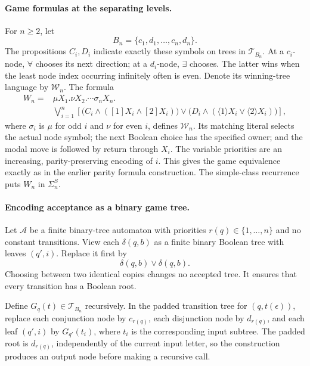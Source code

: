 \paragraph{Game formulas at the separating levels.}
For \(n\geq2\), let
\[
 B_n=\{c_1,d_1,\ldots,c_n,d_n\}.
\]
The propositions \(C_i,D_i\)
indicate exactly these
symbols on trees in
\(\mathcal T_{B_n}\).
At a \(c_i\)-node,
\(\forall\) chooses its
next direction; at a
\(d_i\)-node, \(\exists\)
chooses. The latter wins
when the least node
index occurring infinitely
often is even.
Denote its winning-tree
language by \(\mathcal W_n\).
The formula
\[
\begin{split}
 W_n={}&\mu X_1.\nu X_2.\cdots\sigma_nX_n.\\
 &\bigvee_{i=1}^n
 \left[
   \bigl(C_i\land([1]X_i\land[2]X_i)\bigr)
   \lor
   \bigl(D_i\land(\langle1\rangle X_i
                         \lor\langle2\rangle X_i)\bigr)
 \right],
\end{split}
\]
where \(\sigma_i\) is
\(\mu\) for odd \(i\)
and \(\nu\) for even
\(i\), defines
\(\mathcal W_n\).
Its matching literal
selects the actual node
symbol; the next Boolean
choice has the specified
owner; and the modal
move is followed by
return through \(X_i\).
The variable priorities
are an increasing,
parity-preserving encoding
of \(i\).
This gives the game
equivalence exactly as
in the earlier parity
formula construction.
The simple-class recurrence
puts \(W_n\) in
\(\Sigma_n^S\).

\paragraph{Encoding acceptance as a binary game tree.}
Let \(\mathcal A\) be
a finite binary-tree
automaton with priorities
\(r(q)\in\{1,\ldots,n\}\)
and no constant transitions.
View each \(\delta(q,b)\)
as a finite binary
Boolean tree with leaves
\((q',i)\).
Replace it first by
\[
 \delta(q,b)\lor\delta(q,b).
\]
Choosing between two identical
copies changes no accepted
tree. It ensures that
every transition has a
Boolean root.

Define \(G_q(t)\in\mathcal T_{B_n}\)
recursively. In the padded
transition tree for
\((q,t(\epsilon))\),
replace each conjunction
node by \(c_{r(q)}\),
each disjunction node by
\(d_{r(q)}\), and each
leaf \((q',i)\) by
\(G_{q'}(t_i)\), where
\(t_i\) is the corresponding
input subtree.
The padded root is
\(d_{r(q)}\), independently
of the current input
letter, so the construction
produces an output node
before making a recursive
call.

